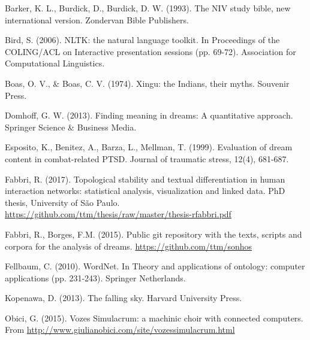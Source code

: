 \documentclass[12pt,fleqn]{article}
\begin{document}
\begin{thebibliography}{99}
\fontsize{11}{0}\selectfont
{}
Barker, K. L., Burdick, D., Burdick, D. W. (1993). The NIV study bible, new international version. Zondervan Bible Publishers.

Bird, S. (2006). NLTK: the natural language toolkit. In Proceedings of the COLING/ACL on Interactive presentation sessions (pp. 69-72). Association for Computational Linguistics.

Boas, O. V., \& Boas, C. V. (1974). Xingu: the Indians, their myths. Souvenir Press.

Domhoff, G. W. (2013). Finding meaning in dreams: A quantitative approach. Springer Science \& Business Media.

Esposito, K., Benitez, A., Barza, L., Mellman, T. (1999). Evaluation of dream content in combat-related PTSD. Journal of traumatic stress, 12(4), 681-687.

Fabbri, R. (2017). Topological stability and textual differentiation in human interaction networks:
		statistical analysis, visualization and linked data. PhD thesis, University of São Paulo.
		\url{https://github.com/ttm/thesis/raw/master/thesis-rfabbri.pdf}

Fabbri, R., Borges, F.M. (2015). Public git repository with the texts, scripts and corpora for the analysis of dreams.
		\url{https://github.com/ttm/sonhos}

Fellbaum, C. (2010). WordNet. In Theory and applications of ontology: computer applications (pp. 231-243). Springer Netherlands.

Kopenawa, D. (2013). The falling sky. Harvard University Press.

Obici, G. (2015). Vozes Simulacrum: a machinic choir with connected computers. From \url{http://www.giulianobici.com/site/vozessimulacrum.html}



\end{thebibliography}





\end{document}
